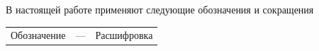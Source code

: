 
В настоящей работе применяют следующие обозначения и сокращения

\begin{tabular}{p{2cm}p{0.5 cm}p{10cm}}
    Обозначение & --- & Расшифровка\\
\end{tabular}


